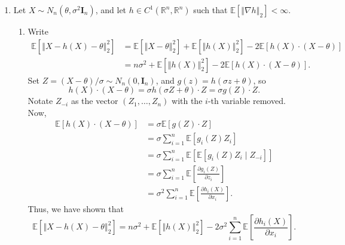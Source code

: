 \documentclass[11pt]{article}
\newcommand{\R}{\mathbb{R}}
\newcommand{\norm}[1]{\left\Vert #1 \right\Vert}
\newcommand{\EE}{\mathbb{E}}
\begin{document}
\begin{enumerate}
        \item Let $X \sim N_n(\theta, \sigma^2 \bm{I}_n)$, and let $h \in
        C^1(\R^n, \R^n)$ such that $\EE[\norm{\nabla h}_2] < \infty$.
        \begin{enumerate}
            \item Write \begin{align*}
                \EE[\norm{X - h(X) - \theta}_2^2]
                    &= \EE[\norm{X - \theta}_2^2] + \EE[\norm{h(X)}_2^2] - 2 \EE[h(X)\cdot (X - \theta)] \\
                    &= n\sigma^2 + \EE[\norm{h(X)}_2^2] - 2 \EE[h(X)\cdot (X - \theta)].
            \end{align*}
            Set $Z = (X - \theta) / \sigma \sim N_n(0, \bm{I}_n)$, and $g(z) =
            h(\sigma z + \theta)$, so \[
                h(X)\cdot (X - \theta)
                    = \sigma h(\sigma Z + \theta)\cdot Z
                    = \sigma g(Z)\cdot Z.
            \] Notate $Z_{-i}$ as the vector $(Z_1, \dots, Z_n)$ with the
            $i$-th variable removed.
            Now, \begin{align*}
                \EE[h(X)\cdot  (X - \theta)]
                    &= \sigma \EE[g(Z)\cdot  Z] \\
                    &= \sigma \sum_{i = 1}^n \EE[g_i(Z) Z_i] \\
                    &= \sigma \sum_{i = 1}^n \EE[\EE[g_i(Z) Z_i \mid Z_{-i}]] \\
                    &= \sigma \sum_{i = 1}^n \EE\left[\frac{\partial g_i(Z)}{\partial z_i}\right] \tag{Stein's method} \\
                    &= \sigma^2 \sum_{i = 1}^n \EE\left[\frac{\partial h_i(X)}{\partial x_i}\right].
            \end{align*}
            Thus, we have shown that \[
                \EE[\norm{X - h(X) - \theta}_2^2]
                    = n\sigma^2 + \EE[\norm{h(X)}_2^2] - 2 \sigma^2 \sum_{i = 1}^n \EE\left[\frac{\partial h_i(X)}{\partial x_i}\right].
            \]



\end{enumerate}
\end{enumerate}
\end{document}
